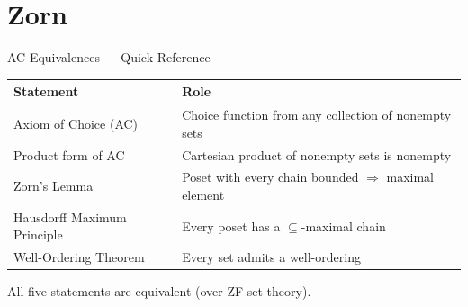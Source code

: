 \section{Zorn}


\begin{toolkitbox}{AC Equivalences --- Quick Reference}
\small
\begin{tabular}{l l}
\toprule
\textbf{Statement} & \textbf{Role} \\
\midrule
Axiom of Choice (AC)         & Choice function from any collection of nonempty sets \\
Product form of AC           & Cartesian product of nonempty sets is nonempty \\
Zorn's Lemma                 & Poset with every chain bounded $\Rightarrow$ maximal element \\
Hausdorff Maximum Principle  & Every poset has a $\subseteq$-maximal chain \\
Well-Ordering Theorem        & Every set admits a well-ordering \\
\bottomrule
\end{tabular}

\medskip
All five statements are equivalent (over ZF set theory).
\end{toolkitbox}


